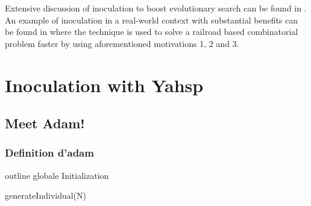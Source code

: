 \documentclass[english]{DESCARWINreport}
\def\UU{{\mathbb{U}}}
\begin{document}
Extensive discussion of inoculation to boost evolutionary search can be found in \cite{Surry96, SurryPhD}. An example of inoculation in a real-world context with substantial benefits can be found in \cite{semetGECCO06} where the technique is used to solve a railroad based combinatorial problem faster by using aforementioned motivations 1, 2 and 3.



\newpage
\chapter{Inoculation with Yahsp}

\section{Meet Adam!}

\subsection{Definition d'adam}

outline globale Initialization

\begin{algorithm}[h!]
\caption{generateIndividual(N)}
\label{algoInit}
{\small
\begin{algorithmic}[1]
 \hfill {}
\hfill {}
\REPEAT
\STATE{$t \leftarrow \UU(T)$} 
 \hfill  {}
  \hfill {}
 \hfill {}
    \hfill {}
\STATE{$n \leftarrow \UU([1,\#A_t])$} \hfill {} \label{init.state}
 \label{begin.loopInit}
\STATE{$a \leftarrow \UU(A_t)$}    \hfill {}
   \hfill {}
  \hfill {}
\ENDWHILE \label{end.loopInit}
  \hfill {}
\ENDFOR
{}
\end{algorithmic}
}
\end{algorithm}
\end{document}
